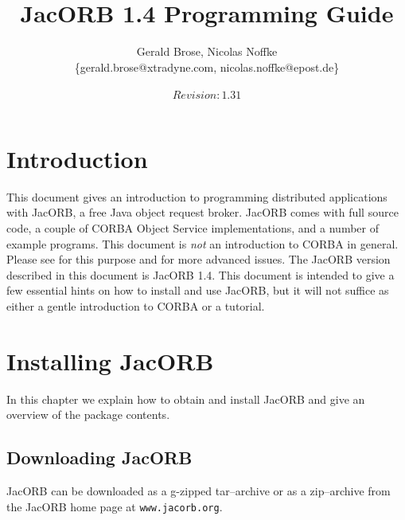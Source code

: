 \documentclass[12pt]{scrbook}
\title{JacORB 1.4 Programming Guide}
\author{Gerald Brose, Nicolas Noffke\\
\{gerald.brose@xtradyne.com, nicolas.noffke@epost.de\}\\
\\
$Revision: 1.31 $
}
\begin{document}
\newcommand{\cmdline}[1]{\begin{small}\noindent \texttt{\$ #1}\end{small}}

\newcommand{\JacORBDir}{JacORB1\_4}
\newcommand{\JacORBVersion}{1.4}

\maketitle


\setlength{\parskip}{1.1ex}
\newpage
\tableofcontents

\chapter{Introduction}

This  document  gives   an  introduction  to  programming  distributed
applications with  JacORB, a free  Java object request  broker. JacORB
comes  with  full  source  code,  a couple  of  CORBA  Object  Service
implementations, and  a number of example programs.   This document is
{\it  not}   an  introduction  to   CORBA  in  general.    Please  see
\cite{Brose2001a,Siegel2000,   Vinoski1997}  for   this   purpose  and
\cite{Henning1999}  for  more  advanced  issues.  The  JacORB  version
described in this document  is JacORB \JacORBVersion. This document is
intended  to give  a few  essential hints  on how  to install  and use
JacORB, but  it will  not suffice as  either a gentle  introduction to
CORBA or a tutorial.


\chapter{Installing JacORB}
\label{Ch_installing}

In this chapter  we explain how to obtain and  install JacORB and give
an overview of the package contents.

\section{Downloading JacORB}


JacORB can be downloaded as a g-zipped tar--archive or as a zip--archive
from the  JacORB home page  at {\tt www.jacorb.org}.
\end{document}
